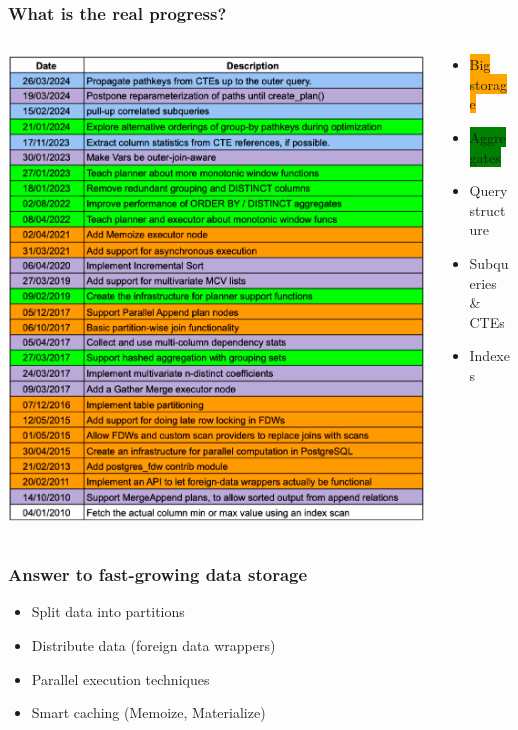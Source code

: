 \documentclass{beamer}
\begin{document}
\begin{frame}\frametitle{What is the real progress?}
\begin{columns}\begin{column}{0.6\textwidth}
	\includegraphics[scale=0.23]{pics/commits}
\end{column}
\begin{column}{0.5\textwidth}
\begin{itemize}
  \item \colorbox{orange}{Big storage}
  \item \colorbox{green}{Aggregates}
  \item \colorbox{purple!40}{Query structure}
  \item \colorbox{blue!40}{Subqueries \& CTEs}
  \item Indexes
\end{itemize}
\end{column}\end{columns}
\end{frame}

\begin{frame}\frametitle{Answer to fast-growing data storage}
\begin{itemize}
  \item Split data into partitions
  \item Distribute data (foreign data wrappers)
  \item Parallel execution techniques
  \item Smart caching (Memoize, Materialize)
\end{itemize}
\end{frame}
\end{document}
